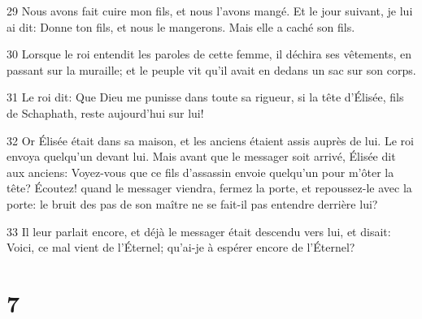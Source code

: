\par 29 Nous avons fait cuire mon fils, et nous l'avons mangé. Et le jour suivant, je lui ai dit: Donne ton fils, et nous le mangerons. Mais elle a caché son fils.
\par 30 Lorsque le roi entendit les paroles de cette femme, il déchira ses vêtements, en passant sur la muraille; et le peuple vit qu'il avait en dedans un sac sur son corps.
\par 31 Le roi dit: Que Dieu me punisse dans toute sa rigueur, si la tête d'Élisée, fils de Schaphath, reste aujourd'hui sur lui!
\par 32 Or Élisée était dans sa maison, et les anciens étaient assis auprès de lui. Le roi envoya quelqu'un devant lui. Mais avant que le messager soit arrivé, Élisée dit aux anciens: Voyez-vous que ce fils d'assassin envoie quelqu'un pour m'ôter la tête? Écoutez! quand le messager viendra, fermez la porte, et repoussez-le avec la porte: le bruit des pas de son maître ne se fait-il pas entendre derrière lui?
\par 33 Il leur parlait encore, et déjà le messager était descendu vers lui, et disait: Voici, ce mal vient de l'Éternel; qu'ai-je à espérer encore de l'Éternel?

\chapter{7}

